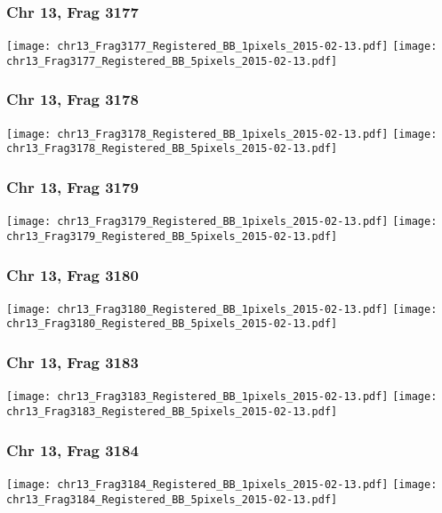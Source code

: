 \documentclass[10pt,dvipsnames,table]{beamer}
\begin{document}
\begin{frame}
\frametitle{Chr 13, Frag 3177}
\begin{center}
\texttt{[image: chr13\_Frag3177\_Registered\_BB\_1pixels\_2015-02-13.pdf]} 
\texttt{[image: chr13\_Frag3177\_Registered\_BB\_5pixels\_2015-02-13.pdf]} 
\end{center}
\end{frame}

\begin{frame}
\frametitle{Chr 13, Frag 3178}
\begin{center}
\texttt{[image: chr13\_Frag3178\_Registered\_BB\_1pixels\_2015-02-13.pdf]} 
\texttt{[image: chr13\_Frag3178\_Registered\_BB\_5pixels\_2015-02-13.pdf]} 
\end{center}
\end{frame}

\begin{frame}
\frametitle{Chr 13, Frag 3179}
\begin{center}
\texttt{[image: chr13\_Frag3179\_Registered\_BB\_1pixels\_2015-02-13.pdf]} 
\texttt{[image: chr13\_Frag3179\_Registered\_BB\_5pixels\_2015-02-13.pdf]} 
\end{center}
\end{frame}

\begin{frame}
\frametitle{Chr 13, Frag 3180}
\begin{center}
\texttt{[image: chr13\_Frag3180\_Registered\_BB\_1pixels\_2015-02-13.pdf]} 
\texttt{[image: chr13\_Frag3180\_Registered\_BB\_5pixels\_2015-02-13.pdf]} 
\end{center}
\end{frame}

\begin{frame}
\frametitle{Chr 13, Frag 3183}
\begin{center}
\texttt{[image: chr13\_Frag3183\_Registered\_BB\_1pixels\_2015-02-13.pdf]} 
\texttt{[image: chr13\_Frag3183\_Registered\_BB\_5pixels\_2015-02-13.pdf]} 
\end{center}
\end{frame}

\begin{frame}
\frametitle{Chr 13, Frag 3184}
\begin{center}
\texttt{[image: chr13\_Frag3184\_Registered\_BB\_1pixels\_2015-02-13.pdf]} 
\texttt{[image: chr13\_Frag3184\_Registered\_BB\_5pixels\_2015-02-13.pdf]} 
\end{center}
\end{frame}
\end{document}
